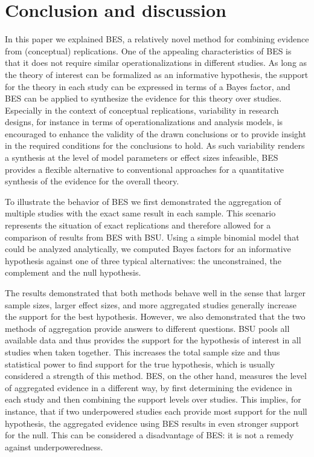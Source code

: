\documentclass[11pt,reqno]{article}
\begin{document}
\section{Conclusion and discussion}
\label{Concl}

In this paper we explained BES, a relatively novel method for combining evidence from (conceptual) replications. One of the appealing characteristics of BES is that it does not require similar operationalizations in different studies. As long as the theory of interest can be formalized as an informative hypothesis, the support for the theory in each study can be expressed in terms of a Bayes factor, and BES can be applied to synthesize the evidence for this theory over studies. Especially in the context of conceptual replications, variability in research designs, for instance in terms of operationalizations and analysis models, is encouraged to enhance the validity of the drawn conclusions or to provide insight in the required conditions for the conclusions to hold. As such variability renders a synthesis at the level of model parameters or effect sizes infeasible, BES provides a flexible alternative to conventional approaches for a quantitative synthesis of the evidence for the overall theory.

To illustrate the behavior of BES we first demonstrated the aggregation of multiple studies with the exact same result in each sample. This scenario represents the situation of exact replications and therefore allowed for a comparison of results from BES with BSU. Using a simple binomial model that could be analyzed analytically, we computed Bayes factors for an informative hypothesis against one of three typical alternatives: the unconstrained, the complement and the null hypothesis. 

The results demonstrated that both methods behave well in the sense that larger sample sizes, larger effect sizes, and more aggregated studies generally increase the support for the best hypothesis. However, we also demonstrated that the two methods of aggregation provide answers to different questions. BSU pools all available data and thus provides the support for the hypothesis of interest in all studies when taken together. This increases the total sample size and thus statistical power to find support for the true hypothesis, which is usually considered a strength of this method. BES, on the other hand, measures the level of aggregated evidence in a different way, by first determining the evidence in each study and then combining the support levels over studies. This implies, for instance, that if two underpowered studies each provide most support for the null hypothesis, the aggregated evidence using BES results in even stronger support for the null. This can be considered a disadvantage of BES: it is not a remedy against underpoweredness. 
\end{document}

